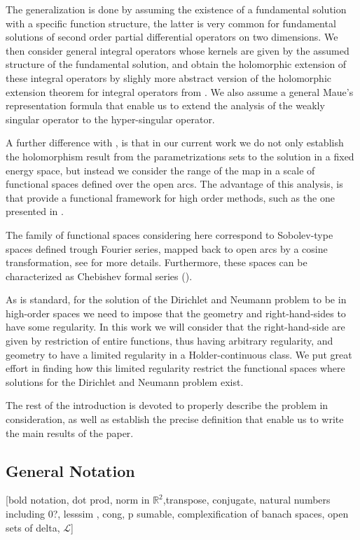 \documentclass{article}
\newcommand{\todo}[1]{{\color{red}[#1]}}
\newcommand{\IR}{{\mathbb R}}
\begin{document}
The generalization is done by assuming the existence of a fundamental solution with a specific function structure, the latter is very common for  fundamental solutions of second order partial differential operators on two dimensions. We then consider general integral operators whose kernels are given by the assumed structure of the fundamental solution, and obtain the holomorphic extension of these integral operators by  slighly more abstract version of the holomorphic extension theorem for integral operators  from \cite[Theorem 3.12]{Henriquez2021}. We also assume a general Maue's representation formula that enable us to extend the analysis of the weakly singular operator to the hyper-singular operator. 

A further difference with \cite{Henriquez2021}, is that in our current work we do not only establish the holomorphism result from the parametrizations sets to the solution in a fixed energy space, but instead we consider the range of the map in a  scale of functional spaces defined over the open arcs. The advantage of this analysis, is that provide a functional  framework for high order methods, such as the one presented in \cite{JHP20}. 

The family of functional spaces considering here correspond to Sobolev-type spaces defined trough Fourier series, mapped back to open arcs by a cosine transformation, see  \cite[Chapter 11]{saranen2013periodic} for more details. Furthermore, these spaces can be characterized as Chebishev formal series (\cite{Averseng2019}). 

As is standard, for the solution of the Dirichlet and Neumann problem to be in high-order spaces we need to impose that the geometry and right-hand-sides  to have some regularity. In this work we will consider that the right-hand-side are given by restriction of entire functions, thus having arbitrary regularity, and geometry to have a limited regularity in a Holder-continuous class. We put great effort in finding how this limited regularity restrict the functional spaces where solutions for the Dirichlet and Neumann problem exist. 

The rest of the introduction is devoted to properly describe the problem in consideration, as well as establish the precise definition that enable us to write the main results of the paper. 

\subsection{General Notation}
\todo{bold notation, dot prod, norm in $\IR^2$,transpose, conjugate, natural numbers including 0?, lesssim , cong, p sumable, complexification of banach spaces, open sets of delta, $\mathcal{L}$}
\end{document}
